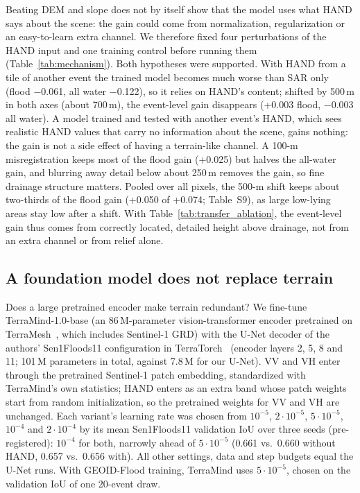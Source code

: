 Beating DEM and slope does not by itself show that the model uses what HAND says about the scene: the gain
could come from normalization, regularization or an easy-to-learn extra channel. We therefore fixed four
perturbations of the HAND input and one training control before running them (Table~\ref{tab:mechanism}).
Both hypotheses were supported. With HAND from a tile of another event the trained model becomes much worse
than SAR only (flood −0.061, all water −0.122), so it relies on HAND's content; shifted by 500\,m in both
axes (about 700\,m), the event-level gain disappears (+0.003 flood, −0.003 all water). A model trained and tested with another
event's HAND, which sees realistic HAND values that carry no information about the scene, gains nothing:
the gain is not a side effect of having a terrain-like channel. A
100-m misregistration keeps most of the flood gain (+0.025) but halves the all-water gain, and blurring
away detail below about 250\,m removes the gain, so fine drainage structure matters. Pooled over all pixels,
the 500-m shift keeps about two-thirds of the flood gain (+0.050 of +0.074; Table~S9), as large low-lying
areas stay low after a shift. With Table~\ref{tab:transfer_ablation}, the event-level gain thus comes from correctly
located, detailed height above drainage, not from an extra channel or from relief alone.

\subsection{A foundation model does not replace terrain}
\label{sec:fm}

Does a large pretrained encoder make terrain redundant? We fine-tune TerraMind-1.0-base
\cite{jakubik2025terramind} (an 86\,M-parameter vision-transformer encoder pretrained on
TerraMesh~\cite{terramesh}, which includes Sentinel-1 GRD) with the U-Net decoder of the authors'
Sen1Floods11 configuration in TerraTorch~\cite{terratorch} (encoder layers 2, 5, 8 and 11; 101\,M
parameters in total, against 7.8\,M for our U-Net). VV and VH enter through the pretrained Sentinel-1 patch
embedding, standardized with TerraMind's own statistics; HAND enters as an extra band whose patch weights
start from random initialization, so the pretrained weights for VV and VH are unchanged. Each variant's
learning rate was chosen from $10^{-5}$, $2\cdot10^{-5}$, $5\cdot10^{-5}$, $10^{-4}$ and $2\cdot10^{-4}$ by
its mean Sen1Floods11 validation IoU over three seeds (pre-registered): $10^{-4}$ for both, narrowly ahead
of $5\cdot10^{-5}$ (0.661 vs.\ 0.660 without HAND, 0.657 vs.\ 0.656 with). All other settings, data and
step budgets equal the U-Net runs. With GEOID-Flood training, TerraMind uses $5\cdot10^{-5}$, chosen on the
validation IoU of one 20-event draw.

